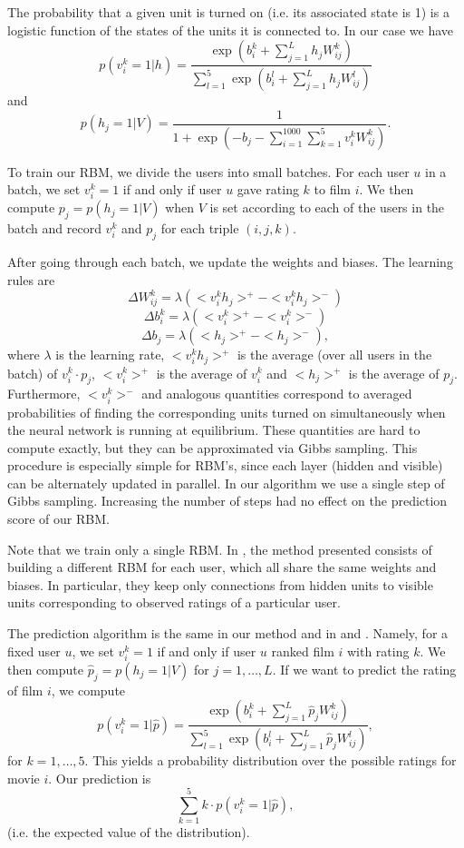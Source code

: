 \documentclass[10pt,conference,compsocconf]{IEEEtran}
\begin{document}
The probability that a given unit is turned on (i.e. its associated state is 1) is a logistic function of the states of the units it is connected to. In our case we have
\[
	p(v^k_i=1|h)=\frac{\exp(b^k_i+\sum_{j=1}^L h_jW^k_{ij})}{\sum_{l=1}^{5}\exp(b^l_i+\sum_{j=1}^{L}h_jW^l_{ij})}
\]
and
\[
	p(h_j=1|V)=\frac{1}{1+\exp(-b_j-\sum_{i=1}^{1000}\sum_{k=1}^{5}v^k_iW^k_{ij})}.
\]

To train our RBM, we divide the users into small batches. For each user $u$ in a batch, we set $v^k_i=1$ if and only if user $u$ gave rating $k$ to film $i$. We then compute $p_j=p(h_j=1|V)$ when $V$ is set according to each of the users in the batch and record $v^k_i$ and $p_j$ for each triple $(i,j,k)$.

After going through each batch, we update the weights and biases. The learning rules are
\[
\Delta W^k_{ij}=\lambda(<v^k_ih_j>^+-<v^k_ih_j>^-)
\]
\[
\Delta b^k_i = \lambda(<v^k_i>^+-<v^k_i>^-)
\]
\[
\Delta b_j = \lambda(<h_j>^+-<h_j>^-),
\]
where $\lambda$ is the learning rate, $<v^k_ih_j>^+$ is the average (over all users in the batch) of $v^k_i\cdot p_j$, $<v^k_i>^+$ is the average of $v^k_i$ and $<h_j>^+$ is the average of $p_j$. Furthermore, $<v^k_i>^-$ and analogous quantities correspond to averaged probabilities of finding the corresponding units turned on simultaneously  when the neural network is running at equilibrium. These quantities are hard to compute exactly, but they can be approximated via Gibbs sampling. This procedure is especially simple for RBM's, since each layer (hidden and visible) can be alternately updated in parallel. In our algorithm we use a single step of Gibbs sampling. Increasing the number of steps had no effect on the prediction score of our RBM.

Note that we train only a single RBM. In \cite{SMH07}, the method presented consists of building a different RBM for each user, which all share the same weights and biases. In particular, they keep only connections from hidden units to visible units corresponding to observed ratings of a particular user.

The prediction algorithm is the same in our method and in \cite{SMH07} and \cite{L10}. Namely, for a fixed user $u$, we set $v^k_i=1$ if and only if user $u$ ranked film $i$ with rating $k$. We then compute $\hat{p}_j=p(h_j=1|V)$ for $j=1,\dots, L$. If we want to predict the rating of film $i$, we compute
\[
	p(v^k_i=1|\hat{p})=\frac{\exp(b^k_i+\sum_{j=1}^L \hat{p}_jW^k_{ij})}{\sum_{l=1}^{5}\exp(b^l_i+\sum_{j=1}^{L}\hat{p}_jW^l_{ij})},
\]
for $k=1,\dots, 5$. This yields a probability distribution over the possible ratings for movie $i$. Our prediction is 
\[
\sum_{k=1}^{5}k\cdot p(v^k_i=1|\hat{p}),
\]
(i.e. the expected value of the distribution).
\end{document}
